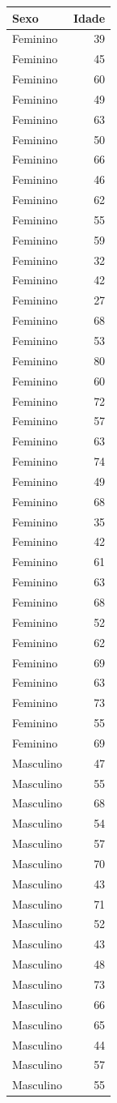 \documentclass[
  letterpaper,
  DIV=11,
  numbers=noendperiod]{scrartcl}
\begin{document}
\begin{longtable}{lr}
\toprule
Sexo & Idade \\ 
\midrule
Feminino & 39 \\ 
Feminino & 45 \\ 
Feminino & 60 \\ 
Feminino & 49 \\ 
Feminino & 63 \\ 
Feminino & 50 \\ 
Feminino & 66 \\ 
Feminino & 46 \\ 
Feminino & 62 \\ 
Feminino & 55 \\ 
Feminino & 59 \\ 
Feminino & 32 \\ 
Feminino & 42 \\ 
Feminino & 27 \\ 
Feminino & 68 \\ 
Feminino & 53 \\ 
Feminino & 80 \\ 
Feminino & 60 \\ 
Feminino & 72 \\ 
Feminino & 57 \\ 
Feminino & 63 \\ 
Feminino & 74 \\ 
Feminino & 49 \\ 
Feminino & 68 \\ 
Feminino & 35 \\ 
Feminino & 42 \\ 
Feminino & 61 \\ 
Feminino & 63 \\ 
Feminino & 68 \\ 
Feminino & 52 \\ 
Feminino & 62 \\ 
Feminino & 69 \\ 
Feminino & 63 \\ 
Feminino & 73 \\ 
Feminino & 55 \\ 
Feminino & 69 \\ 
Masculino & 47 \\ 
Masculino & 55 \\ 
Masculino & 68 \\ 
Masculino & 54 \\ 
Masculino & 57 \\ 
Masculino & 70 \\ 
Masculino & 43 \\ 
Masculino & 71 \\ 
Masculino & 52 \\ 
Masculino & 43 \\ 
Masculino & 48 \\ 
Masculino & 73 \\ 
Masculino & 66 \\ 
Masculino & 65 \\ 
Masculino & 44 \\ 
Masculino & 57 \\ 
Masculino & 55 \\ 
\bottomrule
\end{longtable}
\end{document}
